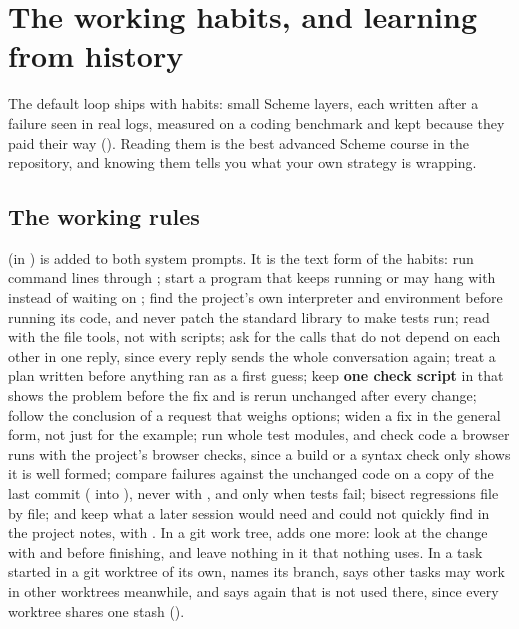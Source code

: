 \chapter{The working habits, and learning from history}
\label{ch:habits}

The default loop ships with habits: small Scheme layers, each written
after a failure seen in real logs, measured on a coding benchmark and kept
because they paid their way (). Reading them is the best
advanced Scheme course in the repository, and knowing them tells you what
your own strategy is wrapping.

\section{The working rules}

 (in ) is added to both system
prompts. It is the text form of the habits: run command lines through
; start a program that keeps running or may hang with
 instead of waiting on ; find the project's own interpreter and environment before
running its code, and never patch the standard library to make tests run;
read with the file tools, not with scripts; ask for the calls that do not
depend on each other in one reply, since every reply sends the whole
conversation again; treat a plan written before
anything ran as a first guess; keep \textbf{one check script} in
 that shows the problem before the fix and is rerun
unchanged after every change; follow the conclusion of a request that
weighs options; widen a fix in the general form, not just for the example;
run whole test modules, and check code a browser runs with the project's
browser checks, since a build or a syntax check only shows it is well
formed; compare failures against the unchanged code on a copy of the last
commit ( into ), never with
, and only when tests fail; bisect regressions file by file;
and keep what a later session would need and could not quickly find in the
project notes, with . In a git work tree,
 adds one more: look at the change with 
and  before finishing, and leave nothing in it that nothing
uses. In a task started in a git worktree of its own,
 names its branch, says other tasks may work in
other worktrees meanwhile, and says again that  is not
used there, since every worktree shares one stash ().


